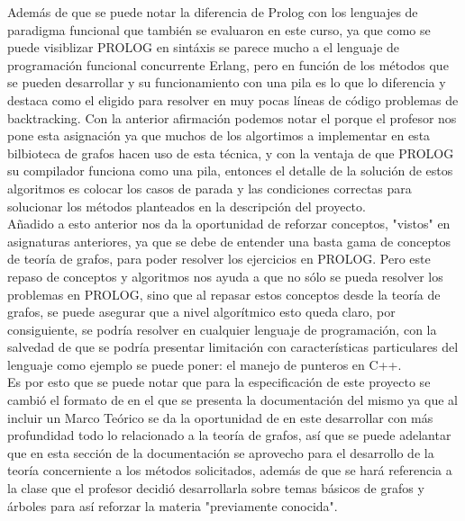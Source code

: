 \documentclass[10pt,a4paper]{article}
\begin{document}
	Además de que se puede notar la diferencia de Prolog con los lenguajes de paradigma funcional que también se evaluaron en este curso, ya que como se puede visiblizar PROLOG en sintáxis se parece mucho a el lenguaje de programación funcional concurrente Erlang, pero en función de los métodos que se pueden desarrollar y su funcionamiento con una pila es lo que lo diferencia y destaca como el eligido para resolver en muy pocas líneas de código problemas de backtracking. Con la anterior afirmación podemos notar el porque el profesor nos pone esta asignación ya que muchos de los algortimos a implementar en esta bilbioteca de grafos hacen uso de esta técnica, y con la ventaja de que PROLOG su compilador funciona como una pila, entonces el detalle de la solución de estos algoritmos es colocar los casos de parada y las condiciones correctas para solucionar los métodos planteados en la descripción del proyecto.\\
	
	Añadido a esto anterior nos da la oportunidad de reforzar conceptos, "vistos" en asignaturas anteriores, ya que se debe de entender una basta gama de conceptos de teoría de grafos, para poder resolver los ejercicios en PROLOG. Pero este repaso de conceptos y algoritmos nos ayuda a que no sólo se pueda resolver los problemas en PROLOG, sino que al repasar estos conceptos desde la teoría de grafos, se puede asegurar que a nivel algorítmico esto queda claro, por consiguiente, se podría resolver en cualquier lenguaje de programación, con la salvedad de que se podría presentar limitación con características particulares del lenguaje como ejemplo se puede poner: el manejo de punteros en C++.\\
	
	Es por esto que se puede notar que para la especificación de este proyecto se cambió el formato de en el que se presenta la documentación del mismo ya que al incluir un Marco Teórico se da la oportunidad de en este desarrollar con más profundidad todo lo relacionado a la teoría de grafos, así que se puede adelantar que en esta sección de la documentación se aprovecho para el desarrollo de la teoría concerniente a los métodos solicitados, además de que se hará referencia a la clase que el profesor decidió desarrollarla sobre temas básicos de grafos y árboles para así reforzar la materia "previamente conocida".\\
	
\end{document}

